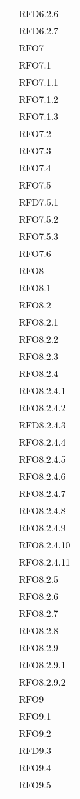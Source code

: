 \begin{longtable}{ p{12cm} | p{4cm} }
			& RFD6.2.6 \\
			& RFD6.2.7 \\
			& RFO7 \\
			& RFO7.1 \\
			& RFO7.1.1 \\
			& RFO7.1.2 \\
			& RFO7.1.3 \\
			& RFO7.2 \\
			& RFO7.3 \\
			& RFO7.4 \\
			& RFO7.5 \\
			& RFD7.5.1 \\
			& RFO7.5.2 \\
			& RFO7.5.3 \\
			& RFO7.6 \\
			& RFO8 \\
			& RFO8.1 \\
			& RFO8.2 \\
			& RFO8.2.1 \\
			& RFO8.2.2 \\
			& RFO8.2.3 \\
			& RFO8.2.4 \\
			& RFO8.2.4.1 \\
			& RFO8.2.4.2 \\
			& RFD8.2.4.3 \\
			& RFO8.2.4.4 \\
			& RFO8.2.4.5 \\
			& RFO8.2.4.6 \\
			& RFO8.2.4.7 \\
			& RFO8.2.4.8 \\
			& RFO8.2.4.9 \\
			& RFO8.2.4.10 \\
			& RFO8.2.4.11 \\
			& RFO8.2.5 \\
			& RFO8.2.6 \\
			& RFO8.2.7 \\
			& RFO8.2.8 \\
			& RFO8.2.9 \\
			& RFO8.2.9.1 \\
			& RFO8.2.9.2 \\
			& RFO9 \\
			& RFO9.1 \\
			& RFO9.2 \\
			& RFD9.3 \\
			& RFO9.4 \\
			& RFO9.5 \\

\end{longtable}
